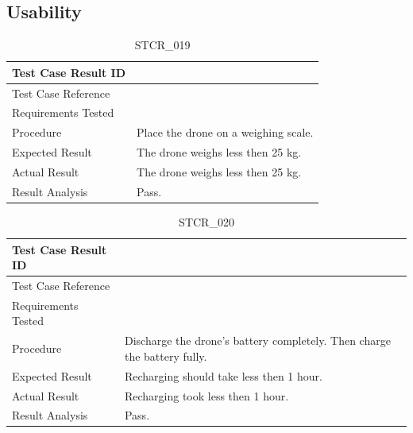 \documentclass[12pt, titlepage]{article}
\begin{document}
\clearpage

\subsection{Usability}

\begin{table}[!h]
\begin{center}
\caption {STCR\_019}
\label{tab:STCR_019}
\begin{tabular}{ | m{3.2cm} | m{12.2cm} | } 
\hline
Test Case Result ID & \nameref{tab:STCR_019} \\ 
\hline
Test Case Reference & \nameref{tab:STC_019}  \\ 
\hline
Requirements Tested & \nameref{STD_001}
 \\ 
\hline
Procedure & Place the drone on a weighing scale. \\
\hline
Expected Result & The drone weighs less then 25 kg.  \\ 
\hline
Actual Result &  The drone weighs less then 25 kg.  \\
\hline
Result Analysis & Pass.  \\ 
\hline
\end{tabular}
\end{center}
\end{table}


\begin{table}[!h]
\begin{center}
\caption {STCR\_020}
\label{tab:STCR_020}
\begin{tabular}{ | m{3.2cm} | m{12.2cm} | } 
\hline
Test Case Result ID & \nameref{tab:STCR_020} \\ 
\hline
Test Case Reference & \nameref{tab:STC_020}  \\ 
\hline
Requirements Tested & \nameref{MTNC_001} \\
\hline
Procedure & Discharge the drone's battery completely. Then charge the battery fully. \\
\hline
Expected Result & Recharging should take less then 1 hour.  \\ 
\hline
Actual Result &  Recharging took less then 1 hour.  \\
\hline
Result Analysis & Pass.  \\ 
\hline
\end{tabular}
\end{center}
\end{table}
\end{document}
